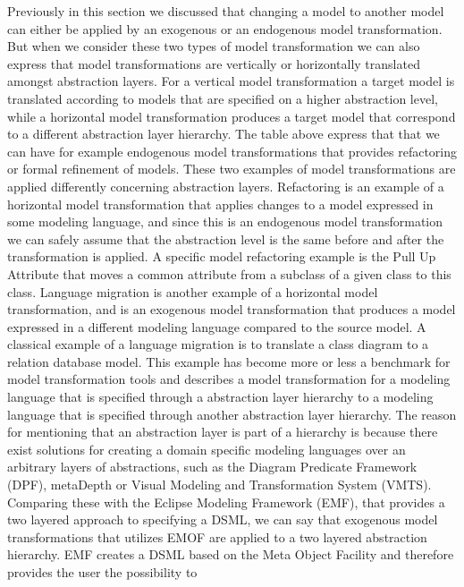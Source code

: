 Previously in this section we discussed that changing a model to another model 
can either be applied by an exogenous or an endogenous model transformation.
But when we consider these two types of model transformation we can also express
that model transformations are vertically or horizontally translated amongst
abstraction layers. For a vertical model transformation a target model is
translated according to models that are specified on a higher abstraction level,
while a horizontal model transformation produces a target model that correspond
to a different abstraction layer hierarchy. The table above express that that we can have
for example endogenous model transformations that provides refactoring or
formal refinement of models. These two examples of model transformations are
applied differently concerning abstraction layers. Refactoring is an example of a
horizontal model transformation that applies changes to a model expressed in
some modeling language, and since this is an endogenous model transformation we
can safely assume that the abstraction level is the same before and after the
transformation is applied. A specific model refactoring example is the Pull Up
Attribute\cite{Henshin_2010} that moves a common attribute from a subclass of a
given class to this class. Language migration is another example of a horizontal
model transformation, and is an exogenous model transformation that produces a
model expressed in a different modeling language compared to the source model.
A classical example of a language migration is to translate a class diagram to a
relation database model. This example has become more or less a benchmark for
model transformation tools and describes a model transformation for a modeling
language that is specified through a abstraction layer hierarchy to a modeling language
that is specified through another abstraction layer hierarchy. The reason for
mentioning that an abstraction layer is part of a hierarchy is because there
exist solutions for creating a domain specific modeling languages over an
arbitrary layers of abstractions, such as the Diagram Predicate
Framework\cite{Lamo2013} (DPF), metaDepth\cite{de2010deep} or Visual Modeling
and Transformation System\cite{levendovszky2005systematic} (VMTS). Comparing
these with the Eclipse Modeling Framework (EMF), that provides a two layered
approach to specifying a DSML, we can say that exogenous model transformations
that utilizes EMOF are applied to a two layered abstraction hierarchy. EMF
creates a DSML based on the Meta Object Facility and therefore provides the user the possibility to
